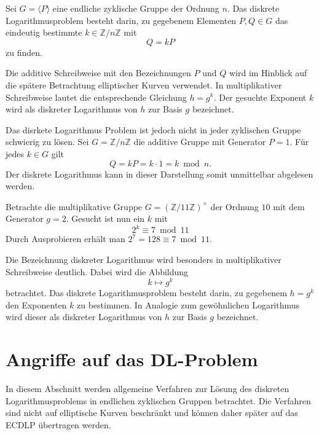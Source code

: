 \begin{definition}
    Sei $G=\langle P\rangle$ eine endliche zyklische Gruppe der Ordnung $n$. Das diskrete
    Logarithmusproblem besteht darin, zu gegebenem Elementen $P,Q\in G$ das eindeutig bestimmte $k\in\mathbb{Z}/n\mathbb{Z}$ mit
    \[
        Q=kP
    \]
    zu finden.
\end{definition}

Die additive Schreibweise mit den Bezeichnungen $P$ und $Q$ wird im Hinblick auf die spätere Betrachtung elliptischer Kurven verwendet. In multiplikativer Schreibweise lautet die entsprechende Gleichung $h=g^k$. Der gesuchte Exponent $k$ wird als diskreter Logarithmus von $h$ zur Basis $g$ bezeichnet.

\begin{beispiel}
    Das disrkete Logarithmus Problem ist jedoch nicht in jeder zyklischen Gruppe schwierig zu lösen. Sei $G=\mathbb{Z}/n\mathbb{Z}$ die additive Gruppe mit Generator $P=1$. Für jedes $k\in G$ gilt
    \[
        Q=kP=k\cdot1=k\bmod n.
    \]
     Der diskrete Logarithmus kann in dieser Darstellung somit unmittelbar abgelesen werden.
\end{beispiel}

\begin{beispiel}
    Betrachte die multiplikative Gruppe \(G={(\mathbb{Z}/11\mathbb{Z})}^{\times}\) der Ordnung $10$ mit dem Generator $g=2$. Gesucht ist nun ein $k$ mit
    \[
        2^k\equiv 7\bmod 11
    \]
    Durch Ausprobieren erhält man \(2^7=128\equiv 7\bmod 11\).
\end{beispiel}
\begin{bemerkung}
    Die Bezeichnung diskreter Logarithmus wird besonders in multiplikativer Schreibweise deutlich. Dabei wird die Abbildung
    \[
        k\longmapsto g^k
    \]
    betrachtet. Das diskrete Logarithmusproblem besteht darin, zu gegebenem $h=g^k$ den Exponenten $k$ zu bestimmen. In Analogie zum gewöhnlichen Logarithmus wird dieser als diskreter Logarithmus von $h$ zur Basis $g$ bezeichnet.
\end{bemerkung}

\section{Angriffe auf das DL-Problem}
In diesem Abschnitt werden allgemeine Verfahren zur Lösung des diskreten Logarithmusproblems in endlichen zyklischen Gruppen betrachtet. Die Verfahren sind nicht auf elliptische Kurven
beschränkt und können daher später auf das ECDLP übertragen werden.

